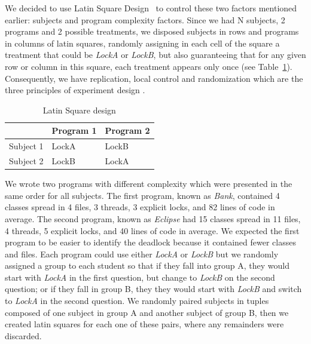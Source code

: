We decided to use Latin Square Design~\cite{box} to control these two factors mentioned earlier: subjects and program complexity factors. Since we had N subjects, 2 programs and 2 possible treatments, we disposed subjects in rows and programs in columns of latin squares, randomly assigning in each cell of the square a treatment that could be \emph{LockA} or \emph{LockB}, but also guaranteeing that for any given row or column in this square, each treatment appears only once (see Table~\ref{tab:latin}). Consequently, we have replication, local control and randomization which are the three principles of experiment design \cite{box}.

\begin{table}
\begin{center}
\caption{Latin Square design}\label{tab:latin}
\begin{tabular}{|l|l|l|}
\hline
 & Program 1 & Program 2\\
\hline
Subject 1 & LockA & LockB\\
Subject 2 & LockB & LockA\\
\hline
\end{tabular}
\end{center}
\end{table}

We wrote two programs with different complexity which were presented in the same order for all subjects. The first program, known as \emph{Bank}, contained 4 classes spread in 4 files, 3 threads, 3 explicit locks, and 82 lines of code in average. The second program, known as \emph{Eclipse} had 15 classes spread in 11 files, 4 threads, 5 explicit locks, and 40 lines of code in average. We expected the first program to be easier to identify the deadlock because it contained fewer classes and files. Each program could use either \emph{LockA} or \emph{LockB} but we randomly assigned a group to each student so that if they fall into group A, they would start with \emph{LockA} in the first question, but change to \emph{LockB} on the second question; or if they fall in group B, they they would start with \emph{LockB} and switch to \emph{LockA} in the second question. We randomly paired subjects in tuples composed of one subject in group A and another subject of group B, then we created latin squares for each one of these pairs, where any remainders were discarded.


